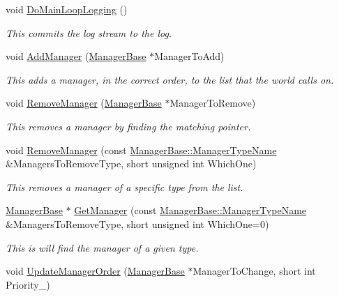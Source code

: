 \begin{DoxyCompactItemize}
void \hyperlink{classphys_1_1World_a1461e6c9d16214aa2cc310035b149378}{DoMainLoopLogging} ()
\begin{DoxyCompactList}\small\item\em This commits the log stream to the log. \item\end{DoxyCompactList}\item 
void \hyperlink{classphys_1_1World_aa709932e21d9d19a91ee38cd7a575556}{AddManager} (\hyperlink{classphys_1_1ManagerBase}{ManagerBase} $\ast$ManagerToAdd)
\begin{DoxyCompactList}\small\item\em This adds a manager, in the correct order, to the list that the world calls on. \item\end{DoxyCompactList}\item 
void \hyperlink{classphys_1_1World_ae3be85997185935421bf5230651d8e37}{RemoveManager} (\hyperlink{classphys_1_1ManagerBase}{ManagerBase} $\ast$ManagerToRemove)
\begin{DoxyCompactList}\small\item\em This removes a manager by finding the matching pointer. \item\end{DoxyCompactList}\item 
void \hyperlink{classphys_1_1World_ad885d1102ecdd13cc277ee3f7dfcb742}{RemoveManager} (const \hyperlink{classphys_1_1ManagerBase_aaa6ccddf23892eaccb898529414f80a5}{ManagerBase::ManagerTypeName} \&ManagersToRemoveType, short unsigned int WhichOne)
\begin{DoxyCompactList}\small\item\em This removes a manager of a specific type from the list. \item\end{DoxyCompactList}\item 
\hyperlink{classphys_1_1ManagerBase}{ManagerBase} $\ast$ \hyperlink{classphys_1_1World_a910befc904c0d0e73b913dedd08e9d98}{GetManager} (const \hyperlink{classphys_1_1ManagerBase_aaa6ccddf23892eaccb898529414f80a5}{ManagerBase::ManagerTypeName} \&ManagersToRemoveType, short unsigned int WhichOne=0)
\begin{DoxyCompactList}\small\item\em This is will find the manager of a given type. \item\end{DoxyCompactList}\item 
void \hyperlink{classphys_1_1World_abbe8ceecc6bdbd542a250fd721c05276}{UpdateManagerOrder} (\hyperlink{classphys_1_1ManagerBase}{ManagerBase} $\ast$ManagerToChange, short int Priority\_\-)

\end{DoxyCompactItemize}
